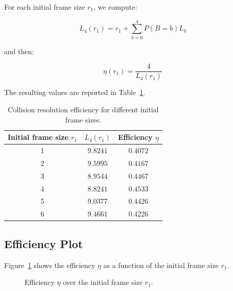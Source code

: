 \documentclass[a4paper,12pt]{article}
\begin{document}
For each initial frame size \(r_1\), we compute:

\[
L_4(r_1) = r_1 + \sum_{b=0}^{4} P(B=b)L_b
\]

and then:

\[
\eta(r_1)=\frac{4}{L_4(r_1)}
\]

The resulting values are reported in Table~\ref{tab:rfid_efficiency}.

\begin{table}[H]
\centering
\begin{tabular}{c c c}
\toprule
Initial frame size \(r_1\) & \(L_4(r_1)\) & Efficiency \(\eta\) \\
\midrule
1 & \(9.8241\) & \(0.4072\) \\
2 & \(9.5995\) & \(0.4167\) \\
3 & \(8.9544\) & \(0.4467\) \\
4 & \(8.8241\) & \(0.4533\) \\
5 & \(9.0377\) & \(0.4426\) \\
6 & \(9.4661\) & \(0.4226\) \\
\bottomrule
\end{tabular}
\caption{Collision resolution efficiency for different initial frame sizes.}
\label{tab:rfid_efficiency}
\end{table}

\subsection{Efficiency Plot}

Figure~\ref{fig:rfid_efficiency} shows the efficiency \(\eta\) as a function of the initial frame size \(r_1\).

\begin{figure}[H]
\centering
{}
\caption{Efficiency \(\eta\) over the initial frame size \(r_1\).}
\label{fig:rfid_efficiency}
\end{figure}
\end{document}
